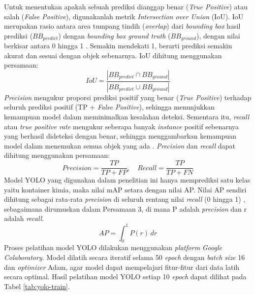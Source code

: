 Untuk menentukan apakah sebuah prediksi dianggap benar (\textit{True
Positive}) atau salah (\textit{False Positive}), digunakanlah metrik
\textit{Intersection over Union} (IoU). IoU merupakan rasio antara area
tumpang tindih (\textit{overlap}) dari \textit{bounding box} hasil prediksi
($BB_{predict}$) dengan
\textit{bounding box ground truth} ($BB_{ground}$), dengan nilai berkisar antara
0 hingga 1 \citep{22}.
Semakin mendekati 1, berarti prediksi semakin akurat dan sesuai
dengan objek sebenarnya. IoU dihitung menggunakan persamaan:
\begin{equation}
  IoU = \frac{|BB_{predict} \cap
  BB_{ground}|}{|BB_{predict} \cup BB_{ground}|}
\end{equation}
\indent
\textit{Precision} mengukur proporsi prediksi positif yang benar (\textit{True
Positive}) terhadap seluruh prediksi positif (TP + \textit{False Positive}),
sehingga menunjukkan kemampuan model dalam meminimalkan kesalahan
deteksi. Sementara itu, \textit{recall} atau \textit{true positive
rate} mengukur seberapa banyak \textit{instance} positif sebenarnya yang
berhasil dideteksi dengan benar, sehingga menggambarkan kemampuan
model dalam menemukan semua objek yang ada \citep{23}. \textit{Precision} dan
\textit{recall} dapat dihitung menggunakan persamaan:
\begin{equation}
  Precision = \frac{TP}{TP + FP}, \quad
  Recall = \frac{TP}{TP + FN}
\end{equation}
Model YOLO yang digunakan dalam penelitian ini hanya
memprediksi satu kelas yaitu kontainer kimia, maka nilai mAP setara
dengan nilai AP. Nilai AP sendiri dihitung sebagai rata-rata
\textit{precision} di seluruh
rentang nilai \textit{recall} (0 hingga 1) \citep{24}, sebagaimana
dirumuskan dalam
Persamaan 3, di mana P adalah \textit{precision} dan r adalah \textit{recall}.
\begin{equation}
  AP = \int_{0}^{1} P(r) \,dr
\end{equation}
Proses pelatihan model YOLO dilakukan menggunakan \textit{platform}
\textit{Google
Colaboratory}. Model dilatih secara iteratif selama 50 \textit{epoch} dengan
\textit{batch size} 16 dan \textit{optimizer} Adam, agar model dapat mempelajari
fitur-fitur dari data latih secara optimal. Hasil pelatihan model
YOLO setiap 10 \textit{epoch} dapat dilihat pada Tabel \ref{tab:yolo-train}.
